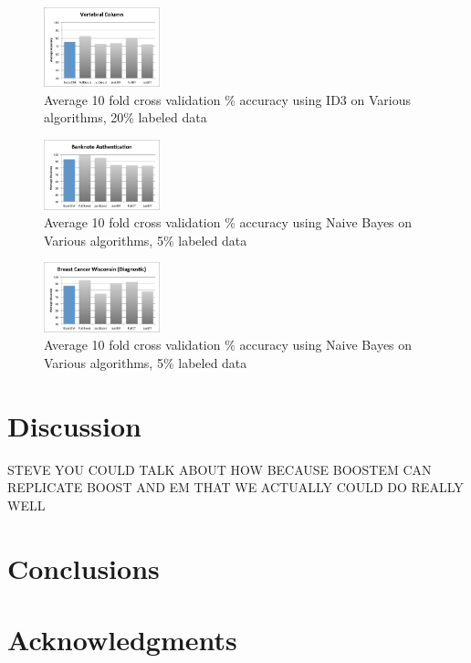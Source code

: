 \documentclass{sig-alternate}
\begin{document}
\begin{figure}
\centering
\includegraphics[width=0.3\textwidth]{figures/vertAcc.pdf}
\caption{Average 10 fold cross validation \% accuracy using ID3 on Various algorithms, 20\% labeled data}
\label{vertAcc}
\end{figure}

\begin{figure}
\centering
\includegraphics[width=0.3\textwidth]{figures/bankAcc5.pdf}
\caption{Average 10 fold cross validation \% accuracy using Naive Bayes on Various algorithms, 5\% labeled data}
\label{vertAcc}
\end{figure}

\begin{figure}
\centering
\includegraphics[width=0.3\textwidth]{figures/breaAcc5.pdf}
\caption{Average 10 fold cross validation \% accuracy using Naive Bayes on Various algorithms, 5\% labeled data}
\label{vertAcc}
\end{figure}

\section{Discussion}
STEVE 
YOU COULD TALK ABOUT HOW BECAUSE BOOSTEM CAN REPLICATE BOOST AND EM THAT WE ACTUALLY COULD DO REALLY WELL
\section{Conclusions}
\section{Acknowledgments}


\end{document}
